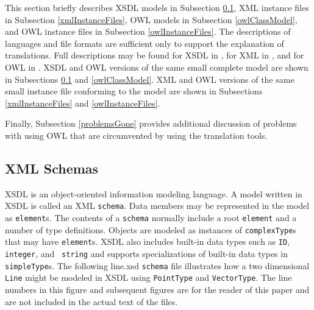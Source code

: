 \documentclass[preprint,12pt]{elsarticle}
\begin{document}
This section briefly describes XSDL models in Subsection \ref{xmlSchemas},
XML instance files in Subsection \ref{xmlInstanceFiles}, OWL models in
Subsection \ref{owlClassModel}, and OWL instance files in Subsection
\ref{owlInstanceFiles}. The descriptions of languages and file formats are
sufficient only to support the explanation of translations. Full
descriptions may be found for XSDL in
\cite{xmlSchema0,xmlSchema1,xmlSchema2,definitive}, for XML in \cite{xml},
and for OWL in \cite{owlPrimer,owlSpecification,protege}. XSDL and OWL
versions of the same small complete model are shown in Subsections
\ref{xmlSchemas} and \ref{owlClassModel}. XML and OWL versions of the same
small instance file conforming to the model are shown in Subsections
\ref{xmlInstanceFiles} and \ref{owlInstanceFiles}.

Finally, Subsection \ref{problemsGone} provides additional discussion of
problems with using OWL that are circumvented by using the translation
tools.

\subsection{XML Schemas}
\label{xmlSchemas}

XSDL is an object-oriented information modeling language. A model written
in XSDL is called an XML {\tt schema}. Data members may be represented in the
model as {\tt element}s. The contents of a {\tt schema} normally include a
root {\tt element} and a number of type definitions. Objects are modeled as
instances of {\tt complexType}s that may have {\tt element}s. XSDL also
includes built-in data types such as {\tt ID}, {\tt integer}, and {\tt
  string} and supports specializations of built-in data types in {\tt
  simpleType}s. The following line.xsd {\tt schema} file illustrates how a
two dimensional {\tt Line} might be modeled in XSDL using {\tt PointType}
and {\tt VectorType}. The line numbers in this figure and subsequent
figures are for the reader of this paper and are not included in the actual
text of the files.
\end{document}
